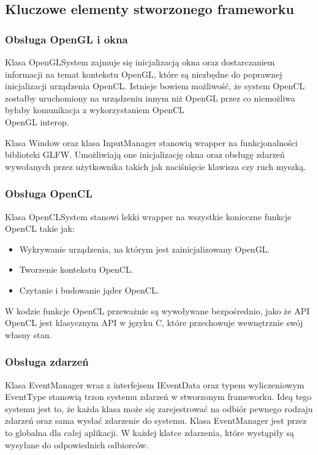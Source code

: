 \documentclass[polish, 12pt]{aghthesis}
\begin{document}
	\subsection{Kluczowe elementy stworzonego frameworku}
		\subsubsection{Obsługa OpenGL i okna}
			Klasa OpenGLSystem zajmuje się inicjalizacją okna oraz dostarczaniem informacji na temat kontekstu OpenGL, które są niezbędne do poprawnej inicjalizacji urządzenia OpenCL. Istnieje bowiem możliwość, że system OpenCL zostałby uruchomiony na urządzeniu innym niż OpenGL przez co niemożliwa byłaby komunikacja z wykorzystaniem OpenCL\\OpenGL interop.
			
			Klasa Window oraz klasa InputManager stanowią wrapper na funkcjonalności biblioteki GLFW. Umożliwiają one inicjalizację okna oraz obsługę zdarzeń wywołanych przez użytkownika takich jak naciśnięcie klawisza czy ruch myszką. 
			
		\subsubsection{Obsługa OpenCL}
			Klasa OpenCLSystem stanowi lekki wrapper na wszystkie konieczne funkcje OpenCL takie jak:
			\begin{itemize}
				\item Wykrywanie urządzenia, na którym jest zainicjalizowany OpenGL.
				\item Tworzenie kontekstu OpenCL.
				\item Czytanie i budowanie jąder OpenCL.
			\end{itemize}
			W kodzie funkcje OpenCL przeważnie są wywoływane bezpośrednio, jako że API OpenCL jest klasycznym API w języku C, które przechowuje wewnętrznie swój własny stan.
			
		\subsubsection{Obsługa zdarzeń}
			Klasa EventManager wraz z interfejsem IEventData oraz typem wyliczeniowym EventType stanowią trzon systemu zdarzeń w stworzonym frameworku. Ideą tego systemu jest to, że każda klasa może się zarejestrować na odbiór pewnego rodzaju zdarzeń oraz sama wysłać zdarzenie do systemu. Klasa EventManager jest przez to globalna dla całej aplikacji. W każdej klatce zdarzenia, które wystąpiły są wysyłane do odpowiednich odbiorców.
			
\end{document}
